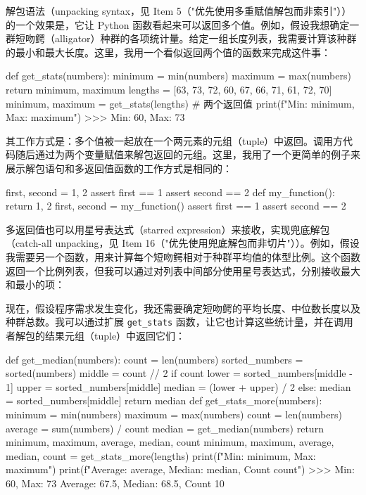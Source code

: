 解包语法（unpacking syntax，见 Item 5（"优先使用多重赋值解包而非索引"））的一个效果是，它让 Python 函数看起来可以返回多个值。例如，假设我想确定一群短吻鳄（alligator）种群的各项统计量。给定一组长度列表，我需要计算该种群的最小和最大长度。这里，我用一个看似返回两个值的函数来完成这件事：

\begin{codebox}[python]
def get_stats(numbers):
    minimum = min(numbers)
    maximum = max(numbers)
    return minimum, maximum
lengths = [63, 73, 72, 60, 67, 66, 71, 61, 72, 70]
minimum, maximum = get_stats(lengths)  # 两个返回值
print(f"Min: {minimum}, Max: {maximum}")
>>>
Min: 60, Max: 73
\end{codebox}

其工作方式是：多个值被一起放在一个两元素的元组（tuple）中返回。调用方代码随后通过为两个变量赋值来解包返回的元组。这里，我用了一个更简单的例子来展示解包语句和多返回值函数的工作方式是相同的：

\begin{codebox}[python]
first, second = 1, 2
assert first == 1
assert second == 2
def my_function():
    return 1, 2
first, second = my_function()
assert first == 1
assert second == 2
\end{codebox}

多返回值也可以用星号表达式（starred expression）来接收，实现兜底解包（catch-all unpacking，见 Item 16（"优先使用兜底解包而非切片"））。例如，假设我需要另一个函数，用来计算每个短吻鳄相对于种群平均值的体型比例。这个函数返回一个比例列表，但我可以通过对列表中间部分使用星号表达式，分别接收最大和最小的项：


现在，假设程序需求发生变化，我还需要确定短吻鳄的平均长度、中位数长度以及种群总数。我可以通过扩展 \texttt{get\_stats} 函数，让它也计算这些统计量，并在调用者解包的结果元组（tuple）中返回它们：

\begin{codebox}[python]
def get_median(numbers):
    count = len(numbers)
    sorted_numbers = sorted(numbers)
    middle = count // 2
    if count %
        lower = sorted_numbers[middle - 1]
        upper = sorted_numbers[middle]
        median = (lower + upper) / 2
    else:
        median = sorted_numbers[middle]
    return median
def get_stats_more(numbers):
    minimum = min(numbers)
    maximum = max(numbers)
    count = len(numbers)
    average = sum(numbers) / count
    median = get_median(numbers)
    return minimum, maximum, average, median, count
minimum, maximum, average, median, count =
    get_stats_more(lengths)
print(f"Min: {minimum}, Max: {maximum}")
print(f"Average: {average}, Median: {median}, Count {count}")
>>>
Min: 60, Max: 73
Average: 67.5, Median: 68.5, Count 10
\end{codebox}


